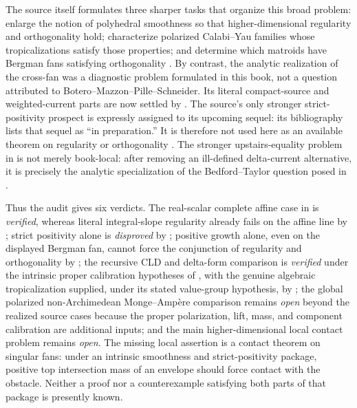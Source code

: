 The source itself formulates three sharper tasks that organize this broad
problem: enlarge the notion of polyhedral smoothness so that higher-dimensional
regularity and orthogonality hold; characterize polarized Calabi--Yau
families whose tropicalizations satisfy those properties; and determine
which matroids have Bergman fans satisfying orthogonality
\cite[pp.~3--5, \S1.5, and Remark~6.27]{BMPS26}.  By contrast, the analytic
realization of the cross-fan was a diagnostic problem formulated in this
book, not a question attributed to Botero--Mazzon--Pille--Schneider.  Its
literal compact-source and weighted-current parts are now settled by
.
The source's only stronger strict-positivity prospect is expressly assigned
to its upcoming sequel: its bibliography lists that sequel as ``in
preparation.''  It is therefore not used here as an available theorem on
regularity or orthogonality \cite[pp.~5 and 60]{BMPS26}.
The stronger upstairs-equality problem in
 is not merely book-local: after
removing an ill-defined delta-current alternative, it is precisely the
analytic specialization of the Bedford--Taylor question posed in
\cite[\S8.6.1 and Definition~8.6.2]{CLD25}.

Thus the audit gives six verdicts.  The real-scalar complete affine case in
 is \emph{verified},
whereas literal integral-slope regularity already fails on the affine line
by ;
strict positivity alone is \emph{disproved} by
; positive growth alone,
even on the displayed Bergman fan, cannot force the conjunction of
regularity and orthogonality by
; the
recursive CLD and
delta-form comparison is \emph{verified} under the intrinsic proper
calibration hypotheses of
, with the genuine
algebraic tropicalization supplied, under its stated value-group
hypothesis, by ; the global polarized
non-Archimedean Monge--Amp\`ere comparison remains \emph{open} beyond the
realized source cases because the proper polarization, lift, mass, and
component calibration are additional inputs; and the main
higher-dimensional local contact problem remains \emph{open}.  The missing local
assertion is a contact theorem on singular fans: under an intrinsic
smoothness and strict-positivity package, positive top intersection mass of
an envelope should force contact with the obstacle.  Neither a proof nor a
counterexample satisfying both parts of that package is presently known.

